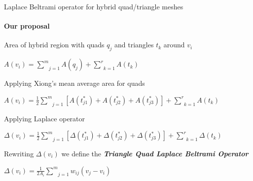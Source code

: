 \documentclass[10pt, compress, english]{beamer}
\begin{document}
\begin{frame}{{\large{}Laplace Beltrami operator for hybrid quad/triangle meshes}}
\framesubtitle{Our proposal}



Area of hybrid region with quads $q_{j}$ and triangles $t_{k}$ around
$v_{i}$


\textrm{$A\left(v_{i}\right)=\underset{j=1}{\overset{m}{\sum}}A(q_{j})+\underset{k=1}{\overset{r}{\sum}}A(t_{k})$}


\bigskip{}



\pause{}


Applying Xiong's mean average area for quads


\textrm{$A\left(v_{i}\right)=\frac{1}{2}\underset{j=1}{\overset{m}{\sum}}\left[A\left(t_{j1}^{*}\right)+A\left(t_{j2}^{*}\right)+A\left(t_{j3}^{*}\right)\right]+\underset{k=1}{\overset{r}{\sum}}A(t_{k})$}


\bigskip{}



\pause{}


Applying Laplace operator


\textrm{$\Delta\left(v_{i}\right)=\frac{1}{2}\underset{j=1}{\overset{m}{\sum}}\left[\Delta\left(t_{j1}^{*}\right)+\Delta\left(t_{j2}^{*}\right)+\Delta\left(t_{j3}^{*}\right)\right]+\underset{k=1}{\overset{r}{\sum}}\Delta(t_{k})$}


\bigskip{}



\pause{}


Rewriting $\Delta\left(v_{i}\right)$ we define the \textbf{\textsl{Triangle
Quad Laplace Beltrami Operator}}


\textrm{$\Delta\left(v_{i}\right)=\frac{1}{2A_{i}}\underset{j=1}{\overset{m}{\sum}}w_{ij}\left(v_{j}-v_{i}\right)$}


\end{frame}
\end{document}
